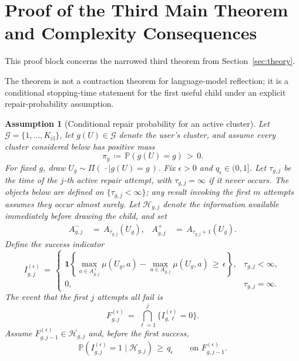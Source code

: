 \documentclass{article} %
\newtheorem{assumption}{Assumption}
\begin{document}
\section{Proof of the Third Main Theorem and Complexity Consequences}

\label{app:proofs3}

This proof block concerns the narrowed third theorem from Section~\ref{sec:theory}.

The theorem is not a contraction theorem for language-model reflection; it is a conditional stopping-time statement for the first useful child under an explicit repair-probability assumption.

\begin{assumption}[Conditional repair probability for an active cluster]
\label{assump:app-repair}
Let \(\mathcal G=\{1,\ldots,K_{\mathrm{cl}}\}\), let \(g(U)\in\mathcal G\)
denote the user's cluster, and assume every cluster considered below has
positive mass
\begin{equation}
\pi_g
\,\coloneqq\,
\mathbb P(g(U)=g)
\,>\,
0.
\end{equation}
For fixed \(g\), draw
\(U_g\sim\Pi(\,\cdot\mid g(U)=g\,)\).  Fix \(\epsilon>0\) and
\(q_\epsilon\in(0,1]\).  Let \(\tau_{g,j}\) be the time of the \(j\)-th active
repair attempt, with \(\tau_{g,j}=\infty\) if it never occurs.  The objects
below are defined on \(\{\tau_{g,j}<\infty\}\); any result invoking the first
\(m\) attempts assumes they occur almost surely.  Let \(\mathcal H_{g,j}\)
denote the information available immediately before drawing the child, and set
\begin{equation}
\begin{aligned}
A_{g,j}^{-}
&\,=\,A_{\tau_{g,j}}(U_g), &
A_{g,j}^{+}
&\,=\,A_{\tau_{g,j}+1}(U_g).
\end{aligned}
\end{equation}
Define the success indicator
\begin{equation}
I_{g,j}^{(\epsilon)}
\,=\,
\begin{cases}
\mathbf{1}\!\left\{
\max_{a\in A_{g,j}^{+}}\mu(U_g,a)
-
\max_{a\in A_{g,j}^{-}}\mu(U_g,a)
\,\ge\,
\epsilon
\right\},
& \tau_{g,j}<\infty,\\[1mm]
0,
& \tau_{g,j}=\infty.
\end{cases}
\end{equation}
The event that the first \(j\) attempts all fail is
\begin{equation}
F_{g,j}^{(\epsilon)}
\,=\,
\bigcap_{\ell=1}^{j}
\{I_{g,\ell}^{(\epsilon)}=0\}.
\end{equation}
Assume \(F_{g,j-1}^{(\epsilon)}\in\mathcal H_{g,j}\) and, before the first
success,
\begin{equation}
\label{eq:app-third-repair-condition}
\mathbb{P}\!\left(
I_{g,j}^{(\epsilon)}=1
\mid
\mathcal{H}_{g,j}
\right)
\,\geq\,
q_{\epsilon}
\qquad
\text{on }F_{g,j-1}^{(\epsilon)}.
\end{equation}
\end{assumption}
\end{document}
